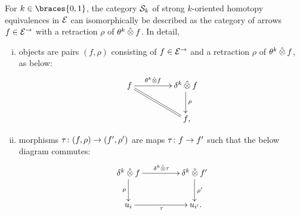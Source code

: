 \documentclass[reqno,10pt,a4paper,oneside,draft]{amsart}
\begin{document}
\begin{lemma} \label{strong-h-equiv-as-section}
For $k \in \braces{0, 1}$, the category $\cal{S}_k$ of strong $k$-oriented homotopy equivalences in $\catE$ can isomorphically be described as the category of arrows $f \in \catE^{\to}$ with a retraction $\rho$ of $\thetak \hatotimes f$.
In detail,
\begin{enumerate}[(i)]
\item objects are pairs $(f, \rho)$ consisting of $f \in \catE^\to$ and a retraction $\rho$ of $\thetak \hatotimes f$, as below:
\[
\xymatrix@C+2em{
  f
  \ar[r]^-{\thetak \hatotimes f}
  \ar@{=}[dr]
&
  \kcyl \hatotimes f \ar[d]^{\rho}
\\&
  f
\rlap{,}}
\]
\item morphisms $\tau \co (f, \rho) \to (f', \rho')$ are maps $\tau \co f \to f'$ such that the below diagram commutes:
\[
\xymatrix@C+2em{
  \kcyl \hatotimes f
  \ar[d]_-{\rho}
  \ar[r]^{\kcyl \hatotimes \tau}
&
 \kcyl \hatotimes f'
  \ar[d]^-{\rho'}
\\
  u_i
  \ar[r]_{\tau}
&
  u_{i'}
\rlap{.}}
\]
\end{enumerate}
\end{lemma}
\end{document}
